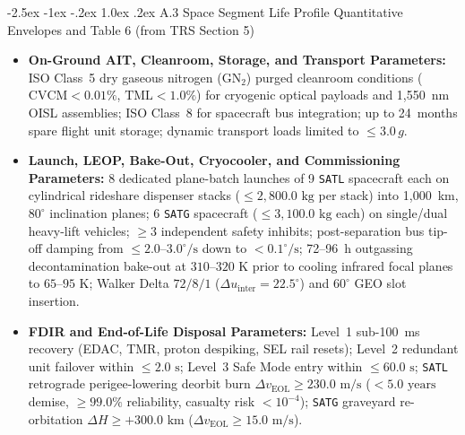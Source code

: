 \documentclass[11pt,a4paper]{article}
\makeatletter
\renewcommand\subsection{\@startsection{subsection}{2}{\z@}%
    {-2.5ex \@plus -1ex \@minus -.2ex}%
    {1.0ex \@plus .2ex}%
    {\normalfont\large\bfseries\sffamily\color{SubHeadingBlue}}}
\providecommand{\abbr}[1]{#1}
\makeatother
\begin{document}
\subsection{A.3 Space Segment Life Profile Quantitative Envelopes and Table 6 (from TRS Section 5)}

\begin{itemize}
    \item \textbf{On-Ground AIT, Cleanroom, Storage, and Transport Parameters:} ISO Class~5 dry gaseous nitrogen ($\mathrm{GN_2}$) purged cleanroom conditions ($\mathrm{CVCM} < 0.01\%$, $\mathrm{TML} < 1.0\%$) for cryogenic optical payloads and 1,550~nm \abbr{OISL} assemblies; ISO Class~8 for spacecraft bus integration; up to 24~months spare flight unit storage; dynamic transport loads limited to $\le 3.0\,g$.
    \item \textbf{Launch, LEOP, Bake-Out, Cryocooler, and Commissioning Parameters:} 8 dedicated plane-batch launches of 9 \texttt{SATL} spacecraft each on cylindrical rideshare dispenser stacks ($\le 2{,}800.0\text{ kg}$ per stack) into 1,000~km, $80^\circ$ inclination planes; 6 \texttt{SATG} spacecraft ($\le 3{,}100.0\text{ kg}$ each) on single/dual heavy-lift vehicles; $\ge 3$ independent safety inhibits; post-separation bus tip-off damping from $\le 2.0\text{--}3.0^\circ/\text{s}$ down to $< 0.1^\circ/\text{s}$; 72--96~h outgassing decontamination bake-out at $310\text{--}320\text{ K}$ prior to cooling infrared focal planes to $65\text{--}95\text{ K}$; Walker Delta $72/8/1$ ($\Delta u_{\text{inter}} = 22.5^\circ$) and $60^\circ$ \abbr{GEO} slot insertion.
    \item \textbf{FDIR and End-of-Life Disposal Parameters:} Level~1 sub-100~ms recovery (\abbr{EDAC}, \abbr{TMR}, proton despiking, \abbr{SEL} rail resets); Level~2 redundant unit failover within $\le 2.0\text{ s}$; Level~3 Safe Mode entry within $\le 60.0\text{ s}$; \texttt{SATL} retrograde perigee-lowering deorbit burn $\Delta v_{\text{EOL}} \ge 230.0\text{ m/s}$ ($< 5.0\text{ years}$ demise, $\ge 99.0\%$ reliability, casualty risk $< 10^{-4}$); \texttt{SATG} graveyard re-orbitation $\Delta H \ge +300.0\text{ km}$ ($\Delta v_{\text{EOL}} \ge 15.0\text{ m/s}$).
\end{itemize}
\end{document}
